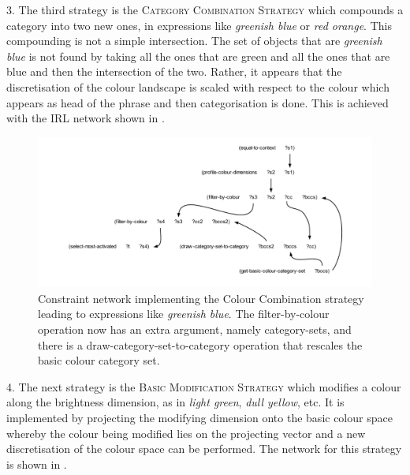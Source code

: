 3. The third strategy is the {\scshape Category Combination Strategy} which compounds a category into two new ones, in 
expressions like \textit{greenish blue} or \textit{red orange}. This compounding is not a simple intersection. The set of objects  
that are \textit{greenish blue} is not found by taking all the ones that are green and all the ones that are blue and then 
the intersection of the two. Rather, it appears that the discretisation of the colour landscape is scaled with respect 
to the colour which appears as head of the phrase and then categorisation is done. This is achieved with the IRL network 
shown in . 

\begin{figure}[htbp]
  \centerline{\includegraphics[width=1.0\textwidth]{chap11/figs/combi.pdf}}
\caption{\label{fig:combi}Constraint network implementing the Colour Combination strategy leading to expressions like \textit{greenish blue}. 
The filter-by-colour operation now has an extra argument, namely category-sets,  
and there is a draw-category-set-to-category operation that rescales the basic colour category set.}
\end{figure}

4. The next strategy is the {\scshape Basic Modification Strategy} which modifies a colour along the brightness dimension, as in 
\textit{light green}, \textit{dull yellow}, etc. It is implemented by projecting the modifying dimension onto the basic colour space 
whereby the colour being modified lies on the projecting vector and a new discretisation of the colour space can be 
performed. The network for this strategy is shown in . 

